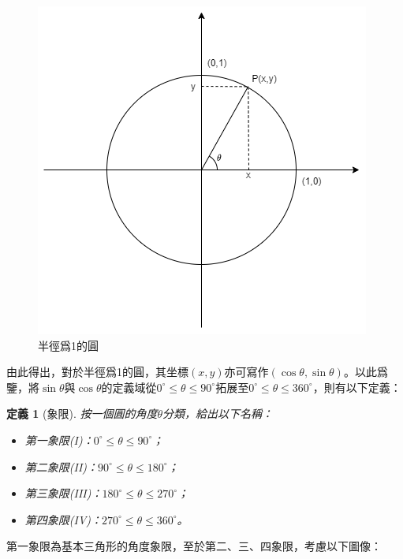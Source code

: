 \documentclass[12pt]{article}
\newtheorem{definition}{定義}
\begin{document}
    \begin{figure}[H]
        \centering
        \includegraphics[scale=0.6]{circle1.png}
        \caption{半徑爲1的圓}
    \end{figure}

    由此得出，對於半徑爲1的圓，其坐標$(x,y)$亦可寫作$(\cos{\theta},\sin{\theta})$。以此爲鑒，將$\sin{\theta}$與$\cos{\theta}$的定義域從$0^\circ \leq \theta\leq 90^\circ$拓展至$0^\circ\leq \theta\leq 360^\circ$，則有以下定義：

    \begin{definition}[象限]
        按一個圓的角度$\theta$分類，給出以下名稱：\begin{itemize}
            \item 第一象限(I)：$0^\circ\leq \theta\leq 90^\circ$；
            \item 第二象限(II)：$90^\circ\leq \theta\leq 180^\circ$；
            \item 第三象限(III)：$180^\circ\leq \theta\leq 270^\circ$；
            \item 第四象限(IV)：$270^\circ\leq \theta\leq 360^\circ$。
        \end{itemize}
    \end{definition}

    第一象限為基本三角形的角度象限，至於第二、三、四象限，考慮以下圖像：
\end{document}

